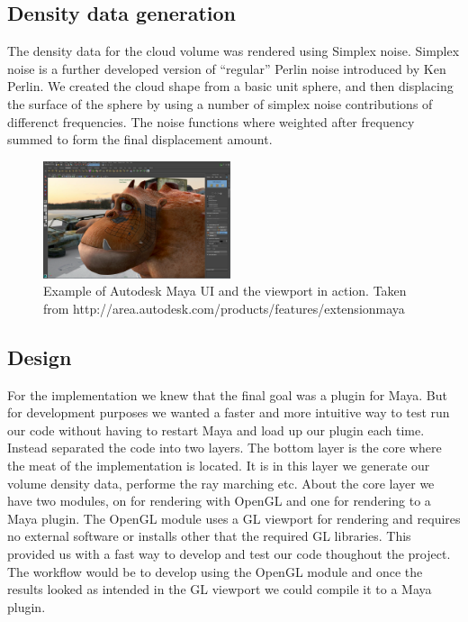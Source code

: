 \documentclass[11pt,twocolumn]{article}
\begin{document}
\subsection{Density data generation}
The density data for the cloud volume was rendered using Simplex noise. Simplex noise is a further developed version of ``regular'' Perlin noise introduced by Ken Perlin. We created the cloud shape from a basic unit sphere, and then displacing the surface of the sphere by using a number of simplex noise contributions of differenct frequencies. The noise functions where weighted after frequency summed to form the final displacement amount.
\begin{figure}
\includegraphics[width=0.49\textwidth]{figures/maya.png}
\caption{Example of Autodesk Maya UI and the viewport in action. Taken from http://area.autodesk.com/products/features/extensionmaya}
\label{fig:mayaviewport}
\end{figure}
\subsection{Design}
For the implementation we knew that the final goal was a plugin for Maya.
But for development purposes we wanted a faster and more intuitive way to test run our code without having to restart Maya and load up our plugin each time.
Instead separated the code into two layers. The bottom layer is the core where the meat of the implementation is located. It is in this layer we generate our volume density data, performe the ray marching etc. About the core layer we have two modules, on for rendering with OpenGL and one for rendering to a Maya plugin. The OpenGL module uses a GL viewport for rendering and requires no external software or installs other that the required GL libraries. This provided us with a fast way to develop and test our code thoughout the project. The workflow would be to develop using the OpenGL module and once the results looked as intended in the GL viewport we could compile it to a Maya plugin.
\end{document}
